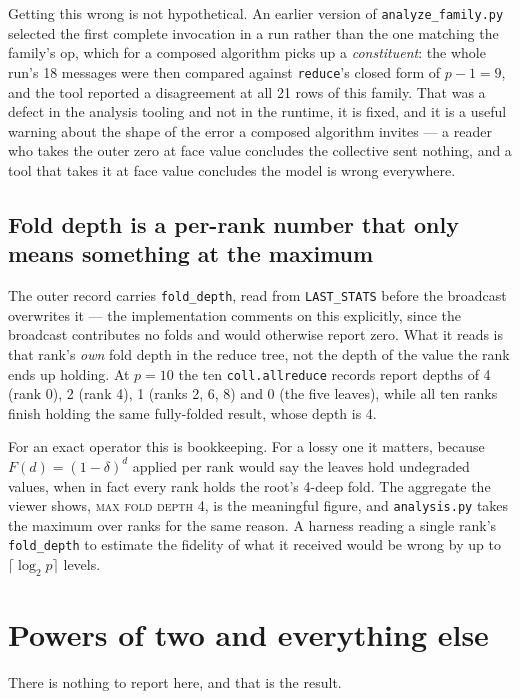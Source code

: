 \documentclass[11pt]{article}
\begin{document}
Getting this wrong is not hypothetical. An earlier version of \texttt{analyze\_family.py}
selected the first complete invocation in a run rather than the one matching the family's op,
which for a composed algorithm picks up a \emph{constituent}: the whole run's 18 messages were
then compared against \texttt{reduce}'s closed form of $p-1 = 9$, and the tool reported a
disagreement at all 21 rows of this family. That was a defect in the analysis tooling and not in
the runtime, it is fixed, and it is a useful warning about the shape of the error a composed
algorithm invites --- a reader who takes the outer zero at face value concludes the collective
sent nothing, and a tool that takes it at face value concludes the model is wrong everywhere.

\subsection{Fold depth is a per-rank number that only means something at the maximum}

The outer record carries \texttt{fold\_depth}, read from \texttt{LAST\_STATS} before the
broadcast overwrites it --- the implementation comments on this explicitly, since the broadcast
contributes no folds and would otherwise report zero. What it reads is that rank's \emph{own}
fold depth in the reduce tree, not the depth of the value the rank ends up holding. At $p=10$ the
ten \texttt{coll.allreduce} records report depths of 4 (rank 0), 2 (rank 4), 1 (ranks 2, 6, 8) and
0 (the five leaves), while all ten ranks finish holding the same fully-folded result, whose depth
is 4.

For an exact operator this is bookkeeping. For a lossy one it matters, because
$F(d) = (1-\delta)^d$ applied per rank would say the leaves hold undegraded values, when in fact
every rank holds the root's 4-deep fold. The aggregate the viewer shows, \textsc{max fold depth}
4, is the meaningful figure, and \texttt{analysis.py} takes the maximum over ranks for the same
reason. A harness reading a single rank's \texttt{fold\_depth} to estimate the fidelity of what
it received would be wrong by up to $\lceil\log_2 p\rceil$ levels.

\section{Powers of two and everything else}

There is nothing to report here, and that is the result.
\end{document}
